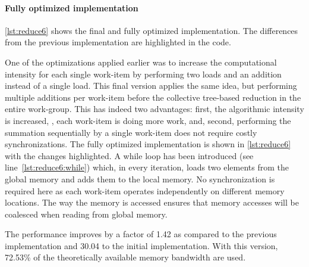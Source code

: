 \paragraph{Fully optimized implementation}

\autoref{lst:reduce6} shows the final and fully optimized implementation.
The differences from the previous implementation are highlighted in the code.

One of the optimizations applied earlier was to increase the computational intensity for each single work-item by performing two loads and an addition instead of a single load.
This final version applies the same idea, but performing multiple additions per work-item before the collective tree-based reduction in the entire work-group.
This has indeed two advantages:
first, the algorithmic intensity is increased, \ie, each work-item is doing more work,
and, second, performing the summation sequentially by a single work-item does not require costly synchronizations.
The fully optimized implementation is shown in \autoref{lst:reduce6} with the changes highlighted.
A while loop has been introduced (see line~\ref{lst:reduce6:while}) which, in every iteration, loads two elements from the global memory and adds them to the local memory.
No synchronization is required here as each work-item operates independently on different memory locations.
The way the memory is accessed ensures that memory accesses will be coalesced when reading from global memory.

The performance improves by a factor of 1.42 as compared to the previous implementation and 30.04 to the initial implementation.
With this version, 72.53\% of the theoretically available memory bandwidth are used.

